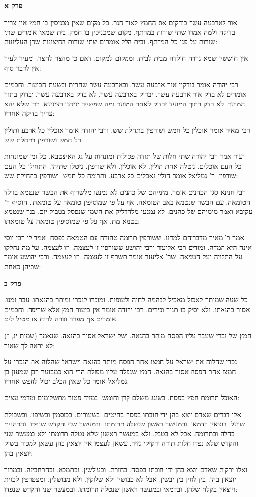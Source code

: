\documentclass[12pt, openany]{book}
\newcommand{\sethebfont}{
\fontsize{10.5pt}{21.0pt} \selectfont
}
\newcommand{\textblock}[1]{
{\sethebfont #1\\}	
}
\newcommand{\sectname}{}
\newcommand{\newsection}[1]{
	\addcontentsline{toc}{section}{#1}
	\renewcommand{\sectname}{#1}	
	\vspace{-\baselineskip}
	\begin{center}
		\textbf{%
\fontsize{16pt}{16pt}\selectfont
			#1}
	\end{center}
	\vspace{-\baselineskip}
	\nopagebreak
}
\begin{document}
\newsection{פרק א}
\textblock{אור לארבעה עשר בודקים את החמץ לאור הנר. כל מקום שאין מכניסין בו חמץ אין צריך בדיקה ולמה אמרו שתי שורות במרתף. מקום שמכניסין בו חמץ. בית שמאי אומרים שתי שורות על פני כל המרתף. ובית הלל אומרים שתי שורות החיצונות שהן העליונות:  }
\textblock{אין חוששין שמא גררה חולדה מבית לבית. וממקום למקום. דאם כן מחצר לחצר. ומעיר לעיר אין לדבר סוף:  }
\textblock{רבי יהודה אומר בודקין אור ארבעה עשר. ובארבעה עשר שחרית ובשעת הביעור. וחכמים אומרים לא בדק אור ארבעה עשר. יבדוק בארבעה עשר. לא בדק בארבעה עשר. יבדוק בתוך המועד. לא בדק בתוך המועד יבדוק לאחר המועד ומה שמשייר יניחנו בצינעא. כדי שלא יהא צריך בדיקה אחריו:  }
\textblock{רבי מאיר אומר אוכלין כל חמש ושורפין בתחלת שש. ורבי יהודה אומר אוכלין כל ארבע ותולין כל חמש ושורפין בתחלת שש:  }
\textblock{ועוד אמר רבי יהודה שתי חלות של תודה פסולות ומונחות על גג האיצטבא. כל זמן שמונחות כל העם אוכלים. ניטלה אחת תולין. לא אוכלין. ולא שורפין. ניטלו שתיהן. התחילו כל העם שורפין. ר' גמליאל אומר חולין נאכלים כל ארבע. ותרומה כל חמש. ושורפין כתחילת שש:  }
\textblock{רבי חנינא סגן הכהנים אומר. מימיהם של כהנים לא נמנעו מלשרוף את הבשר שנטמא בוולד הטומאה. עם הבשר שנטמא באב הטומאה. אף על פי שמוסיפין טומאה על טומאתו. הוסיף ר' עקיבא ואמר מימיהם של כהנים. לא נמנעו מלהדליק את השמן שנפסל בטבול יום. בנר שנטמא בטמא מת. אף על פי שמוסיפין טומאה על טומאתו:  }
\textblock{אמר ר' מאיר מדבריהם למדנו. ששורפין תרומה טהורה עם הטמאה בפסח. אמר לו רבי יוסי אינה היא המדה. ומודים רבי אליעזר ורבי יהושע ששורפין זו לעצמה. וזו לעצמה. על מה נחלקו על התלויה ועל הטמאה. שר' אליעזר אומר תשרף זו לעצמה. וזו לעצמה. ורבי יהושע אומר שתיהן כאחת:  }
\newsection{פרק ב}
\textblock{כל שעה שמותר לאכול מאכיל לבהמה לחיה ולעופות. ומוכרו לנכרי ומותר בהנאתו. עבר זמנו. אסור בהנאתו. ולא יסיק בו תנור וכירים. רבי יהודה אומר אין ביעור חמץ אלא שריפה. וחכמים אומרים אף מפרר וזורה לרוח או מטיל לים:  }
\textblock{חמץ של נכרי שעבר עליו הפסח מותר בהנאה. ושל ישראל אסור בהנאה. שנאמר (שמות יג, ז) לא יראה לך שאור:  }
\textblock{נכרי שהלוה את ישראל על חמצו אחר הפסח מותר בהנאה וישראל שהלוה את הנכרי על חמצו אחר הפסח אסור בהנאה. חמץ שנפלה עליו מפולת הרי הוא כמבוער רבן שמעון בן גמליאל אומר כל שאין הכלב יכול לחפש אחריו:  }
\textblock{האוכל תרומת חמץ בפסח. בשוגג משלם קרן וחומש. במזיד פטור מתשלומים ומדמי עצים:  }
\textblock{אלו דברים שאדם יוצא בהן ידי חובתו בפסח בחיטים. בשעורים. בכוסמין ובשיפון. ובשבולת שועל. ויוצאין בדמאי. ובמעשר ראשון שנטלה תרומתו. ובמעשר שני והקדש שנפדו. והכהנים בחלה ובתרומה. אבל לא בטבל. ולא במעשר ראשון שלא נטלה תרומתו ולא במעשר שני והקדש שלא נפדו חלות תודה ורקיקי נזיר. עשאן לעצמו אין יוצאין בהן עשאן למכור בשוק יוצאין בהן:  }
\textblock{ואלו ירקות שאדם יוצא בהן ידי חובתו בפסח. בחזרת. ובעולשין. ובתמכא. ובחרחבינה. ובמרור יוצאין בהן. בין לחין בין יבשין. אבל לא כבושין ולא שלוקין. ולא מבושלין. ומצטרפין לכזית ויוצאין בקלח שלהן. ובדמאי ובמעשר ראשון שנטלה תרומתו. ובמעשר שני והקדש שנפדו:  }
\end{document}
